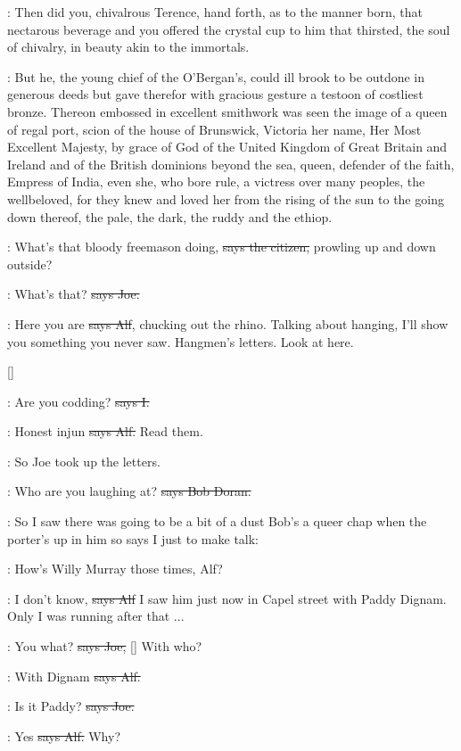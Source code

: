 :
Then did you,
chivalrous Terence,
hand forth,
as to the manner born,
that nectarous beverage and you offered the crystal cup to him that
thirsted,
the soul of chivalry,
in beauty akin to the immortals.

:
But he,
the young chief of the O'Bergan's,
could ill brook to be outdone
in generous deeds but gave therefor with gracious gesture a testoon
of costliest bronze.
Thereon embossed in excellent smithwork was seen the
image of a queen of regal port,
scion of the house of Brunswick,
Victoria
her name,
Her Most Excellent Majesty,
by grace of God of the United
Kingdom of Great Britain and Ireland and of the British dominions beyond
the sea,
queen,
defender of the faith,
Empress of India,
even she,
who
bore rule,
a victress over many peoples,
the wellbeloved,
for they knew
and loved her from the rising of the sun to the going down thereof,
the
pale,
the dark,
the ruddy and the ethiop.

\citizen:
What's that bloody freemason doing,
\sout{says the citizen,}
prowling up and down outside?

\joe:
What's that?
\sout{says Joe.}

\bergan:
Here you are
\sout{says Alf},
chucking out the rhino.
Talking about hanging,
I'll show you something you never saw.
Hangmen's letters.
Look at here.

[]

:
Are you codding?
\sout{says I.}

\bergan:
Honest injun
\sout{says Alf.}
Read them.

\Nq:
So Joe took up the letters.

\doran:
Who are you laughing at?
\sout{says Bob Doran.}

\Nq:
So I saw there was going to be a bit of a dust Bob's a queer chap
when the porter's up in him so says I just to make talk:

:
How's Willy Murray those times,
Alf?

\bergan:
I don't know,
\sout{says Alf}
I saw him just now in Capel street with Paddy
Dignam.
Only I was running after that ...

\joe:
You what?
\sout{says Joe,} []
With who?

\bergan:
With Dignam
\sout{says Alf.}

\joe:
Is it Paddy?
\sout{says Joe.}

\bergan:
Yes
\sout{says Alf.}
Why?

